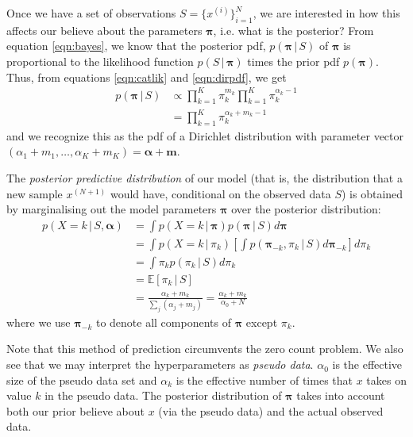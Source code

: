 \documentclass[final,3p,times,twocolumn]{elsarticle}
\let\bs\boldsymbol
\begin{document}
Once we have a set of observations $S = \{x^{(i)}\}_{i=1}^N$, we are interested in how this affects our believe about the parameters $\bs \pi$, i.e. what is the posterior?
From equation \ref{eqn:bayes}, we know that the posterior pdf, $p(\bs \pi \,|\, S)$ of $\bs \pi$ is proportional to the likelihood function $p(S\,|\,\bs \pi)$ times the prior pdf $p(\bs \pi)$.
Thus, from equations \ref{eqn:catlik} and \ref{eqn:dirpdf}, we get
\begin{equation}
\label{eqn:dirpost}
\begin{split}
p(\bs \pi \,|\, S) &\propto \prod\nolimits_{k=1}^K\pi_k^{m_k} \prod\nolimits_{k=1}^K \pi_k^{\alpha_k - 1}\\
	&= \prod\nolimits_{k=1}^K \pi_k^{\alpha_k+m_k-1}
\end{split}
\end{equation}
and we recognize this as the pdf of a Dirichlet distribution with parameter vector $(\alpha_1+m_1,\dots,\alpha_K+m_K) = \bs \alpha + \bs m$.

The \emph{posterior predictive distribution} of our model (that is, the distribution that a new sample $x^{(N+1)}$ would have, conditional on the observed data $S$) is obtained by marginalising out the model parameters $\bs \pi$ over the posterior distribution:
\begin{equation}
\begin{split}
p(X = k\,|\,S, \bs \alpha) &= \int p(X = k\,|\,\bs \pi)p(\bs \pi \,|\,S)d\bs\pi\\
&= \int p(X = k\,|\,\pi_k)\left[\int p(\bs \pi_{-k},\pi_k\,|\,S)d\bs\pi_{-k}\right]d\pi_k\\
&= \int \pi_k p(\pi_k\,|\,S)d\pi_k\\
&= \mathbb{E}\left[\pi_k\,|\,S\right]\\
&= \frac{\alpha_k + m_k}{\sum_j (\alpha_j+m_j)} = \frac{\alpha_k+m_k}{\alpha_0 + N}
\end{split}
\end{equation}
where we use $\bs \pi_{-k}$ to denote all components of $\bs \pi$ except $\pi_k$.

Note that this method of prediction circumvents the zero count problem.
We also see that we may interpret the hyperparameters as \emph{pseudo data}.
$\alpha_0$ is the effective size of the pseudo data set and $\alpha_k$ is the effective number of times that $x$ takes on value $k$ in the pseudo data.
The posterior distribution of $\bs \pi$ takes into account both our prior believe about $x$ (via the pseudo data) and the actual observed data.
\end{document}
